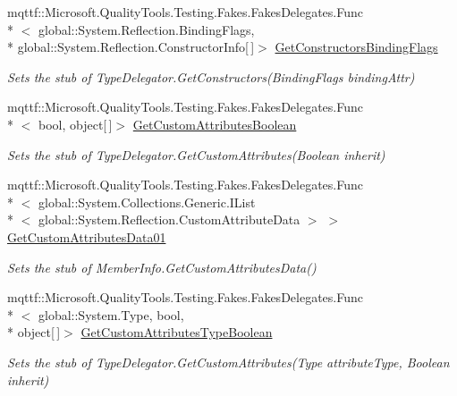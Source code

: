 \begin{DoxyCompactItemize}
mqttf\-::\-Microsoft.\-Quality\-Tools.\-Testing.\-Fakes.\-Fakes\-Delegates.\-Func\\*
$<$ global\-::\-System.\-Reflection.\-Binding\-Flags, \\*
global\-::\-System.\-Reflection.\-Constructor\-Info\mbox{[}$\,$\mbox{]}$>$ \hyperlink{class_system_1_1_reflection_1_1_fakes_1_1_stub_type_delegator_a93a7fa3b485a9d33e36699b01fdb00b5}{Get\-Constructors\-Binding\-Flags}
\begin{DoxyCompactList}\small\item\em Sets the stub of Type\-Delegator.\-Get\-Constructors(\-Binding\-Flags binding\-Attr)\end{DoxyCompactList}\item 
mqttf\-::\-Microsoft.\-Quality\-Tools.\-Testing.\-Fakes.\-Fakes\-Delegates.\-Func\\*
$<$ bool, object\mbox{[}$\,$\mbox{]}$>$ \hyperlink{class_system_1_1_reflection_1_1_fakes_1_1_stub_type_delegator_a21e4f627f669c2def106c75364743f4b}{Get\-Custom\-Attributes\-Boolean}
\begin{DoxyCompactList}\small\item\em Sets the stub of Type\-Delegator.\-Get\-Custom\-Attributes(\-Boolean inherit)\end{DoxyCompactList}\item 
mqttf\-::\-Microsoft.\-Quality\-Tools.\-Testing.\-Fakes.\-Fakes\-Delegates.\-Func\\*
$<$ global\-::\-System.\-Collections.\-Generic.\-I\-List\\*
$<$ global\-::\-System.\-Reflection.\-Custom\-Attribute\-Data $>$ $>$ \hyperlink{class_system_1_1_reflection_1_1_fakes_1_1_stub_type_delegator_a0745b0be8941915bbbf37cb4d4629146}{Get\-Custom\-Attributes\-Data01}
\begin{DoxyCompactList}\small\item\em Sets the stub of Member\-Info.\-Get\-Custom\-Attributes\-Data()\end{DoxyCompactList}\item 
mqttf\-::\-Microsoft.\-Quality\-Tools.\-Testing.\-Fakes.\-Fakes\-Delegates.\-Func\\*
$<$ global\-::\-System.\-Type, bool, \\*
object\mbox{[}$\,$\mbox{]}$>$ \hyperlink{class_system_1_1_reflection_1_1_fakes_1_1_stub_type_delegator_a81381ffceb6ab3bc9f60dc9b6868e69b}{Get\-Custom\-Attributes\-Type\-Boolean}
\begin{DoxyCompactList}\small\item\em Sets the stub of Type\-Delegator.\-Get\-Custom\-Attributes(\-Type attribute\-Type, Boolean inherit)\end{DoxyCompactList}\item 

\end{DoxyCompactItemize}
